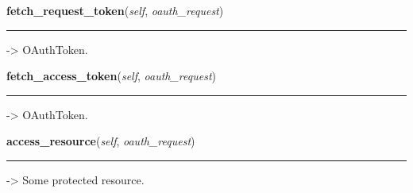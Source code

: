     \label{lib:oauth:OAuthClient:fetch_request_token}

    \vspace{0.5ex}

\hspace{.8\funcindent}\begin{boxedminipage}{\funcwidth}

    \raggedright \textbf{fetch\_request\_token}(\textit{self}, \textit{oauth\_request})

    \vspace{-1.5ex}

    \rule{\textwidth}{0.5\fboxrule}
\setlength{\parskip}{2ex}
    -{\textgreater} OAuthToken.

\setlength{\parskip}{1ex}
    \end{boxedminipage}

    \label{lib:oauth:OAuthClient:fetch_access_token}

    \vspace{0.5ex}

\hspace{.8\funcindent}\begin{boxedminipage}{\funcwidth}

    \raggedright \textbf{fetch\_access\_token}(\textit{self}, \textit{oauth\_request})

    \vspace{-1.5ex}

    \rule{\textwidth}{0.5\fboxrule}
\setlength{\parskip}{2ex}
    -{\textgreater} OAuthToken.

\setlength{\parskip}{1ex}
    \end{boxedminipage}

    \label{lib:oauth:OAuthClient:access_resource}

    \vspace{0.5ex}

\hspace{.8\funcindent}\begin{boxedminipage}{\funcwidth}

    \raggedright \textbf{access\_resource}(\textit{self}, \textit{oauth\_request})

    \vspace{-1.5ex}

    \rule{\textwidth}{0.5\fboxrule}
\setlength{\parskip}{2ex}
    -{\textgreater} Some protected resource.

\setlength{\parskip}{1ex}
    \end{boxedminipage}



